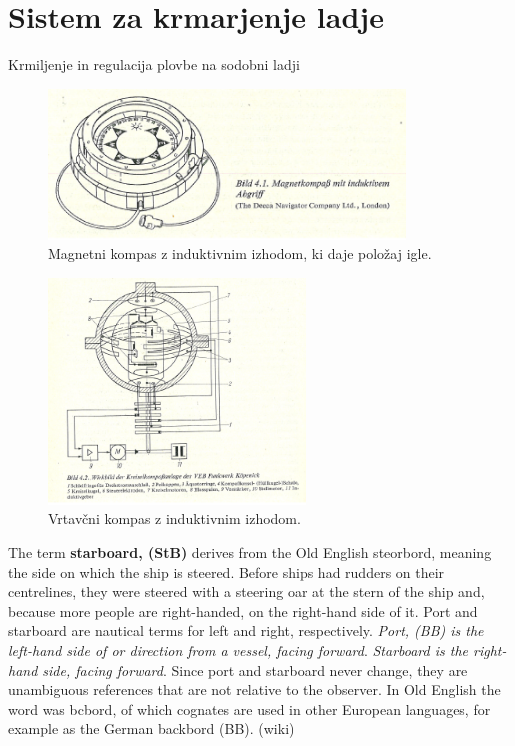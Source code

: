 %
\chapter{Sistem za krmarjenje ladje }
\label{intro} %

Krmiljenje in regulacija plovbe na sodobni ladji

\begin{figure}
	\centering
	\includegraphics[height=4cm]{Predavanja/11_SodobnoKrmarjenjeLadje/figs/SLK4p1.png}
	\caption{Magnetni kompas z induktivnim izhodom, ki daje položaj igle.}%
	\label{fig:MagnetniKompasInduktIzhod}       %
\end{figure}

\begin{figure}
	\centering
	\includegraphics[height=6cm]{Predavanja/11_SodobnoKrmarjenjeLadje/figs/SLK4p2.png}
	\caption{Vrtavčni kompas z induktivnim izhodom.}%
	\label{fig:VrtavcniKompasInduktIzhod}       %
\end{figure}

The term \textbf{starboard, (StB)} derives from the Old English steorbord, meaning the side on which the ship is steered. Before ships had rudders on their centrelines, they were steered with a steering oar at the stern of the ship and, because more people are right-handed, on the right-hand side of it. Port and starboard are nautical terms for left and right, respectively. \textit{Port, (BB) is the left-hand side of or direction from a vessel, facing forward}. \textit{Starboard is the right-hand side, facing forward}. Since port and starboard never change, they are unambiguous references that are not relative to the observer. In Old English the word was bcbord, of which cognates are used in other European languages, for example as the German backbord (BB). (wiki)

